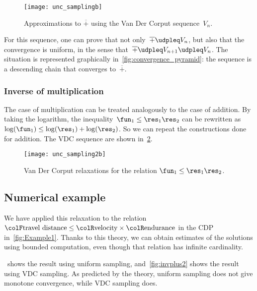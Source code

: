 \begin{figure}[h]
    \centering
    \texttt{[image: unc\_samplingb]}
    \caption{
        Approximations to $\overline{+}$ using the Van Der Corput sequence~$V_{n}$.
    }
    \label{fig:Vn}
\end{figure}

For this sequence, one can prove that not only~$\overline{+}\udpleq V_{n}$, but also that the convergence is uniform, in the sense that~$\overline{+}\udpleq V_{n+1}\udpleq V_{n}$.
The situation is represented graphically in~\cref{fig:convergence_pyramid}: the sequence is a descending chain that converges to~$\overline{+}$.

\subsubsection{Inverse of multiplication}

The case of multiplication can be treated analogously to the case of addition.
By taking the logarithm, the inequality~$\fun_{1}\leq\res_{1}\res_{2}$ can be rewritten as~$\log(\fun_{1})\leq\log(\res_{1})+\log(\res_{2})$.
So we can repeat the constructions done for addition.
The VDC sequence are shown in~\cref{fig:approx_invmult}.

\begin{figure}[h]
    \centering
    \texttt{[image: unc\_sampling2b]}
    \caption{
        Van Der Corput relaxations for the relation $\fun_{1}\leq\res_{1}\res_{2}$.}
    \label{fig:approx_invmult}
\end{figure}

\subsection{Numerical example}

We have applied this relaxation to the relation ${\colF\text{travel distance}}\leq{\colR\text{velocity}}\times{\colR\text{endurance}}$ in the CDP in~\cref{fig:Example1}.
Thanks to this theory, we can obtain estimates of the solutions using bounded computation, even though that relation has infinite cardinality.

~shows the result using uniform sampling, and~\cref{fig:invplus2} shows the result using VDC sampling.
As predicted by the theory, uniform sampling does not give monotone convergence, while VDC sampling does.
\vfill

